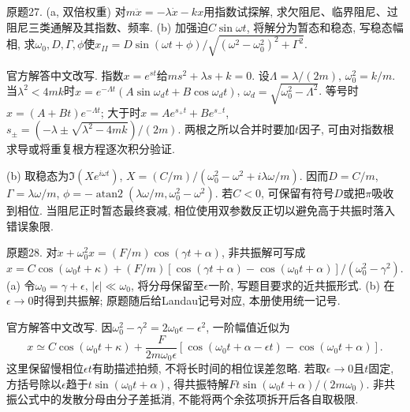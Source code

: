 \begin{exercise}
原题27. (a, 双倍权重) 对$m\ddot x=-\lambda\dot x-kx$用指数试探解, 求欠阻尼、临界阻尼、过阻尼三类通解及其指数、频率. (b) 加强迫$C\sin\omega t$, 将解分为暂态和稳态, 写稳态幅相, 求$\omega_0,D,\Gamma,\phi$使$x_{II}=D\sin(\omega t+\phi)/\sqrt{(\omega^2-\omega_0^2)^2+\Gamma^2}$.
\end{exercise}
\begin{solution}
官方解答中文改写. 指数$x=e^{st}$给$ms^2+\lambda s+k=0$. 设$\Lambda=\lambda/(2m)$, $\omega_0^2=k/m$. 当$\lambda^2<4mk$时$x=e^{-\Lambda t}(A\sin\omega_dt+B\cos\omega_dt)$, $\omega_d=\sqrt{\omega_0^2-\Lambda^2}$. 等号时$x=(A+Bt)e^{-\Lambda t}$; 大于时$x=Ae^{s_+t}+Be^{s_-t}$, $s_\pm=(-\lambda\pm\sqrt{\lambda^2-4mk})/(2m)$. 两根之所以合并时要加$t$因子, 可由对指数根求导或将重复根方程逐次积分验证.

(b) 取稳态为$\Im(Xe^{i\omega t})$, $X=(C/m)/(\omega_0^2-\omega^2+i\lambda\omega/m)$. 因而$D=C/m$, $\Gamma=\lambda\omega/m$, $\phi=-\operatorname{atan2}(\lambda\omega/m,\omega_0^2-\omega^2)$. 若$C<0$, 可保留有符号$D$或把$\pi$吸收到相位. 当阻尼正时暂态最终衰减, 相位使用双参数反正切以避免高于共振时落入错误象限.
\end{solution}

\begin{exercise}
原题28. 对$\ddot x+\omega_0^2x=(F/m)\cos(\gamma t+\alpha)$, 非共振解可写成
$x=C\cos(\omega_0t+\kappa)+(F/m)[\cos(\gamma t+\alpha)-\cos(\omega_0t+\alpha)]/(\omega_0^2-\gamma^2)$.
(a) 令$\omega_0=\gamma+\epsilon$, $|\epsilon|\ll\omega_0$, 将分母保留至$\epsilon$一阶, 写题目要求的近共振形式. (b) 在$\epsilon\to0$时得到共振解; 原题随后给Landau记号对应, 本册使用统一记号.
\end{exercise}
\begin{solution}
官方解答中文改写. 因$\omega_0^2-\gamma^2=2\omega_0\epsilon-\epsilon^2$, 一阶幅值近似为
\[
x\simeq C\cos(\omega_0t+\kappa)+\frac{F}{2m\omega_0\epsilon}
[\cos(\omega_0t+\alpha-\epsilon t)-\cos(\omega_0t+\alpha)].
\]
这里保留慢相位$\epsilon t$有助描述拍频, 不将长时间的相位误差忽略. 若取$\epsilon\to0$且$t$固定, 方括号除以$\epsilon$趋于$t\sin(\omega_0t+\alpha)$, 得共振特解$Ft\sin(\omega_0t+\alpha)/(2m\omega_0)$. 非共振公式中的发散分母由分子差抵消, 不能将两个余弦项拆开后各自取极限.
\end{solution}

